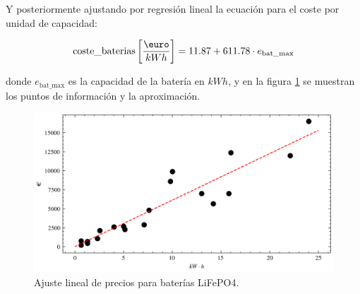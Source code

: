 Y posteriormente ajustando por regresión lineal la ecuación para el coste por
unidad de capacidad:

\begin{equation}
	\text{coste\_baterias} \left[\frac{\text{\euro}}{kWh}\right] = 11.87 + 611.78 \cdot e_{\text{bat\_max}}
\end{equation}

donde $e_{\text{bat\_max}}$ es la capacidad de la batería en $kWh$, y en la
figura \ref{fig:batteries_regression} se muestran los puntos de información y
la aproximación.

\begin{figure}[h] \centering
	\centering
	\includegraphics[width=1\textwidth]{./capitulos/adquisicion_de_datos/images/batteries_regression.png}
	\caption{Ajuste lineal de precios para baterías LiFePO4.}
	\label{fig:batteries_regression}
\end{figure}

